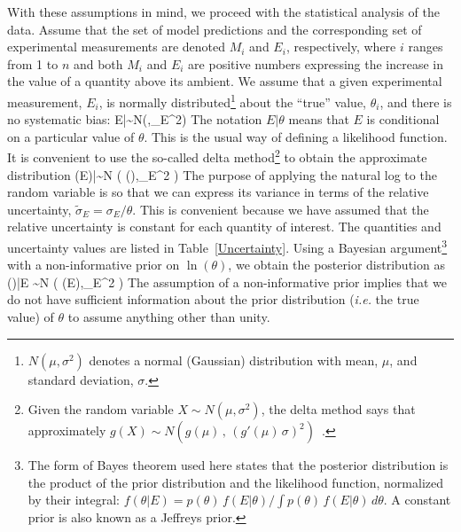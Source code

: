 With these assumptions in mind, we proceed with the statistical analysis of the data.
Assume that the set of model predictions and the corresponding set of experimental measurements are denoted
$M_i$ and $E_i$, respectively, where $i$ ranges from 1 to $n$ and both $M_i$ and $E_i$ are positive numbers
expressing the increase in the value of a quantity above its ambient.
We assume that a given experimental measurement, $E_i$, is normally
distributed\footnote{$N(\mu,\sigma^2)$ denotes a normal (Gaussian) distribution
with mean, $\mu$, and standard deviation, $\sigma$.} about the ``true'' value, $\theta_i$, and there is no systematic bias:
\be E|\theta \sim N(\theta,\sigma_E^2) \label{expunc} \ee
The notation $E|\theta$ means that $E$ is conditional on a particular value of $\theta$.
This is the usual way of defining a likelihood function.
It is convenient to use the so-called delta method\footnote{Given the random variable $X \sim N(\mu,\sigma^2)$, the delta method
says that approximately $g(X) \sim N \left( g(\mu) \, , \, (g'(\mu) \, \sigma)^2\right)$~\cite{Oehlert:1992}.} to obtain the approximate distribution
\be \ln(E)|\theta \sim N \left( \ln(\theta),\widetilde{\sigma}_E^2 \right) \label{eeq} \ee
The purpose of applying the natural log to the random variable is so that we can express its variance in terms of the
relative uncertainty, $\widetilde{\sigma}_E=\sigma_E/\theta$. This is convenient because we have assumed that the relative
uncertainty is constant for each quantity of interest. The quantities and uncertainty values are listed in Table~\ref{Uncertainty}.
Using a Bayesian argument\footnote{The form of Bayes theorem used here states that the posterior distribution is the product of
the prior distribution and the likelihood function, normalized by their integral: $f(\theta|E)= p(\theta) \, f(E|\theta)/\int p(\theta) \, f(E|\theta) \, d\theta$.
A constant prior is also known as a Jeffreys prior.}
with a non-informative prior on $\ln(\theta)$, we obtain the posterior distribution as
\be \ln(\theta)|E \sim N \left( \ln(E),\widetilde{\sigma}_E^2 \right) \label{thetaeq} \ee
The assumption of a non-informative prior implies that we do not have sufficient information about the prior distribution ({\em i.e.} the true value) of
$\theta$ to assume anything other than unity.

